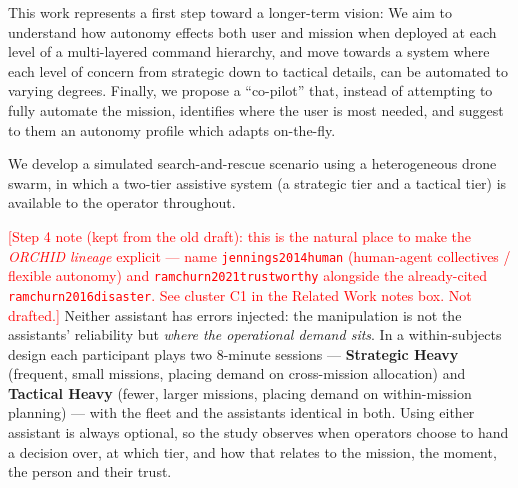 \documentclass[10pt]{article}
\theoremstyle{definition}
\begin{document}
This work represents a first step toward a longer-term vision: We aim to understand how autonomy effects both user and mission when deployed at each level of a multi-layered command hierarchy, and move towards a system where each level of concern from strategic down to tactical details, can be automated to varying degrees. Finally, we propose a ``co-pilot'' that, instead of attempting to fully automate the mission, identifies where the user is most needed, and suggest to them an autonomy profile which adapts on-the-fly.

We develop a simulated search-and-rescue scenario using a heterogeneous drone swarm, in which a two-tier assistive system (a strategic tier and a tactical tier) is available to the operator throughout.


\textcolor{red}{[Step 4 note (kept from the old draft): this is the natural place to make the \emph{ORCHID lineage} explicit --- name \texttt{jennings2014human} (human-agent collectives / flexible autonomy) and \texttt{ramchurn2021trustworthy} alongside the already-cited \texttt{ramchurn2016disaster}. See cluster C1 in the Related Work notes box. Not drafted.]}
Neither assistant has errors injected: the manipulation is not the assistants' reliability but \emph{where the operational demand sits}. In a within-subjects design each participant plays two 8-minute sessions --- \textbf{Strategic Heavy} (frequent, small missions, placing demand on cross-mission allocation) and \textbf{Tactical Heavy} (fewer, larger missions, placing demand on within-mission planning) --- with the fleet and the assistants identical in both. Using either assistant is always optional, so the study observes when operators choose to hand a decision over, at which tier, and how that relates to the mission, the moment, the person and their trust.
\end{document}
